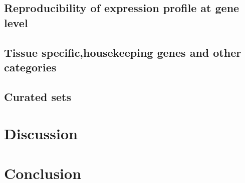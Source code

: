     \subsection{Reproducibility of expression profile at gene level}\label{sec:Trans_ReproExpresGene}

    \subsection{Tissue specific,housekeeping genes and other categories}\label{sec:Trans_TissueSpeAndHK}

    \subsection{Curated sets}\label{sec:Trans_curatedSets}

\section{Discussion}\label{sec:Trans_discussion}

\section{Conclusion}\label{sec:Trans_conclusion}


